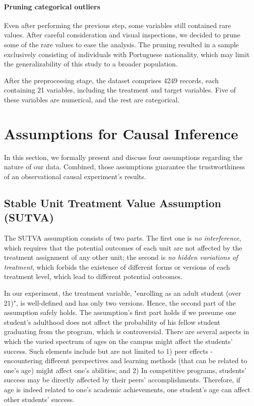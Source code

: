 \documentclass{article}
\begin{document}
\paragraph{Pruning categorical outliers} Even after performing the previous step, some variables still contained rare values. After careful consideration and visual inspections, we decided to prune some of the rare values to ease the analysis. The pruning resulted in a sample exclusively consisting of individuals with Portuguese nationality, which may limit the generalizability of this study to a broader population. 

After the preprocessing stage, the dataset comprises 4249 records, each containing 21 variables, including the treatment and target variables. Five of these variables are numerical, and the rest are categorical.


\section{Assumptions for Causal Inference}\label{sec:assumptions}

In this section, we formally present and discuss four assumptions regarding the nature of our data. Combined, those assumptions guarantee the trustworthiness of an observational causal experiment's results.

\subsection{Stable Unit Treatment Value Assumption (SUTVA)}

The SUTVA assumption consists of two parts. The first one is \emph{no interference}, which requires that the potential outcomes of each unit are not affected by the treatment assignment of any other unit; the second is \emph{no hidden variations of treatment}, which forbids the existence of different forms or versions of each treatment level, which lead to different potential outcomes.

In our experiment, the treatment variable, "enrolling as an adult student (over 21)", is well-defined and has only two versions. Hence, the second part of the assumption safely holds. The assumption's first part holds if we presume one student's adulthood does not affect the probability of his fellow student graduating from the program, which is controversial. There are several aspects in which the varied spectrum of ages on the campus might affect the students' success. Such elements include but are not limited to 1) peer effects - encountering different perspectives and learning methods (that can be related to one's age) might affect one's abilities; and 2) In competitive programs, students' success may be directly affected by their peers' accomplishments. Therefore, if age is indeed related to one's academic achievements, one student's age can affect other students' success.
\end{document}
